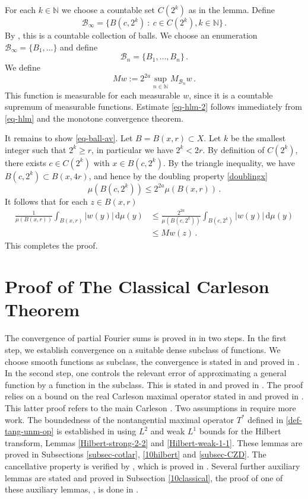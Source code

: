 For each $k \in \mathbb{N}$ we choose a countable set $C(2^k)$ as in the lemma.
Define
$$
    \mathcal{B}_\infty = \{B(c, 2^k) \ : \ c \in C(2^k), k \in \mathbb{N}\}\,.
$$
By , this is a countable collection of balls. We choose an enumeration $\mathcal{B}_\infty = \{B_1, \dotsc\}$ and define
$$
    \mathcal{B}_n = \{B_1, \dotsc, B_n\}\,.
$$
We define
$$
    Mw := 2^{2a}\sup_{n \in \mathbb{N}} M_{\mathcal{B}_n}w\,.
$$
This function is measurable for each measurable $w$, since it is a countable supremum of measurable functions. Estimate \eqref{eq-hlm-2} follows immediately from \eqref{eq-hlm} and the monotone convergence theorem.

It remains to show \eqref{eq-ball-av}. Let $B = B(x, r) \subset X$. Let $k$ be the smallest integer such that $2^k \ge r$, in particular we have $2^k < 2r$. By definition of $C(2^k)$, there exists $c \in C(2^k)$ with $x \in B(c, 2^k)$. By the triangle inequality, we have $B(c, 2^k) \subset B(x, 4r)$, and hence by the doubling property \eqref{doublingx}
$$
    \mu(B(c, 2^k)) \le 2^{2a} \mu(B(x,r))\,.
$$
It follows that for each $z \in B(x,r)$
\begin{align*}
    \frac{1}{\mu(B(x,r))}\int_{B(x,r)} |w(y)| \, \mathrm{d}\mu(y) &\le \frac{2^{2a}}{\mu(B(c,2^k))}\int_{B(c,2^k)} |w(y)| \, \mathrm{d}\mu(y) \\
    &\le Mw(z)\,.
\end{align*}
This completes the proof.


\chapter{Proof of The Classical Carleson Theorem}



The convergence of partial Fourier sums is proved in
 in two steps. In the first step,
we establish convergence on a suitable dense subclass of functions. We choose smooth functions as subclass, the convergence is stated in  and proved in .
In the second step, one controls the relevant error of approximating a general function by a function in
the subclass. This is stated in  and proved
in .
The proof relies on a bound on the real Carleson maximal operator stated in  and proved in .
This latter proof refers to the main Carleson . Two assumptions in  require more work. The boundedness of the nontangential maximal operator $T^*$ defined in \eqref{def-tang-unm-op} is established in  using $L^2$ and weak $L^1$ bounds for the Hilbert transform, Lemmas
\ref{Hilbert-strong-2-2} and \ref{Hilbert-weak-1-1}. These lemmas are proved in Subsections \ref{subsec-cotlar},
\ref{10hilbert} and \ref{subsec-CZD}.
The cancellative property is verified by , which is proved in .
Several further auxiliary lemmas are stated
and proved in Subsection
\ref{10classical}, the proof of one of these auxiliary lemmas, , is done in .

